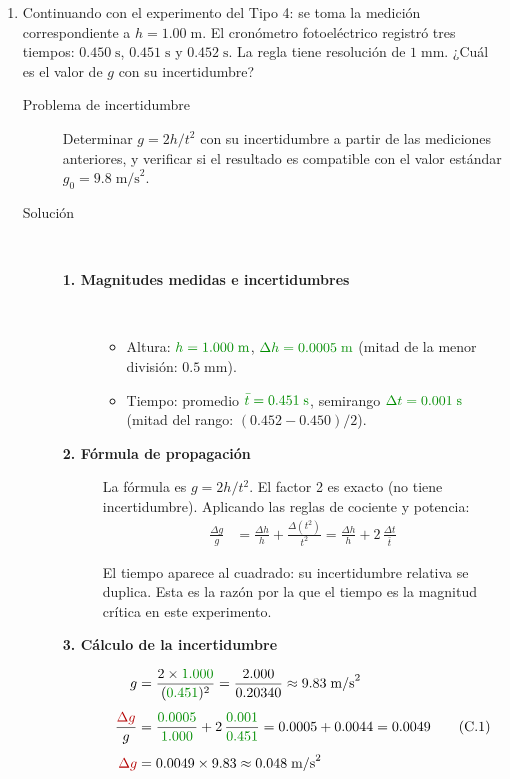 \documentclass[11pt]{book}
\newcommand{\dato}[1]{\textcolor{colDatos}{#1}}
\newcommand{\incog}[1]{\textcolor{colIncog}{#1}}
\begin{document}
\begin{enumerate}
\item Continuando con el experimento del Tipo 4: se toma la medición correspondiente a $h = 1.00\;\text{m}$. El cronómetro fotoeléctrico registró tres tiempos: $0.450\;\text{s}$, $0.451\;\text{s}$ y $0.452\;\text{s}$. La regla tiene resolución de $1\;\text{mm}$. ¿Cuál es el valor de $g$ con su incertidumbre?

\begin{description}
\item[Problema de incertidumbre]
Determinar $g = 2h/t^2$ con su incertidumbre a partir de las mediciones anteriores, y verificar si el resultado es compatible con el valor estándar $g_0 = 9.8\;\text{m/s}^2$.

\item[Solución]~

\begin{description}
    \item[\textbf{1. Magnitudes medidas e incertidumbres}]~
    \begin{itemize}
        \item Altura: $\dato{h = 1.000\;\text{m}}$, $\dato{\Delta h = 0.0005\;\text{m}}$ (mitad de la menor división: $0.5\;\text{mm}$).
        \item Tiempo: promedio $\dato{\bar{t} = 0.451\;\text{s}}$, semirango $\dato{\Delta t = 0.001\;\text{s}}$ (mitad del rango: $(0.452 - 0.450)/2$).
    \end{itemize}

    \item[\textbf{2. Fórmula de propagación}]
    La fórmula es $g = 2h/t^2$. El factor 2 es exacto (no tiene incertidumbre). Aplicando las reglas de cociente y potencia:
    \begin{align}
        \frac{\Delta g}{g} &= \frac{\Delta h}{h} + \frac{\Delta(t^2)}{t^2} = \frac{\Delta h}{h} + 2\,\frac{\Delta t}{\bar{t}} \tag{P.1}
    \end{align}

    El tiempo aparece al cuadrado: su incertidumbre relativa se duplica. Esta es la razón por la que el tiempo es la magnitud crítica en este experimento.

    \item[\textbf{3. Cálculo de la incertidumbre}]
    \begin{align}
        g &= \frac{2 \times \dato{1.000}}{(\dato{0.451})^2} = \frac{2.000}{0.20340} \approx 9.83\;\text{m/s}^2 \nonumber\\[4pt]
        \frac{\incog{\Delta g}}{g} &= \frac{\dato{0.0005}}{\dato{1.000}} + 2\,\frac{\dato{0.001}}{\dato{0.451}} = 0.0005 + 0.0044 = 0.0049 \tag{C.1}\\[4pt]
        \incog{\Delta g} &= 0.0049 \times 9.83 \approx 0.048\;\text{m/s}^2 \nonumber
    \end{align}


\end{description}
\end{description}
\end{enumerate}
\end{document}
